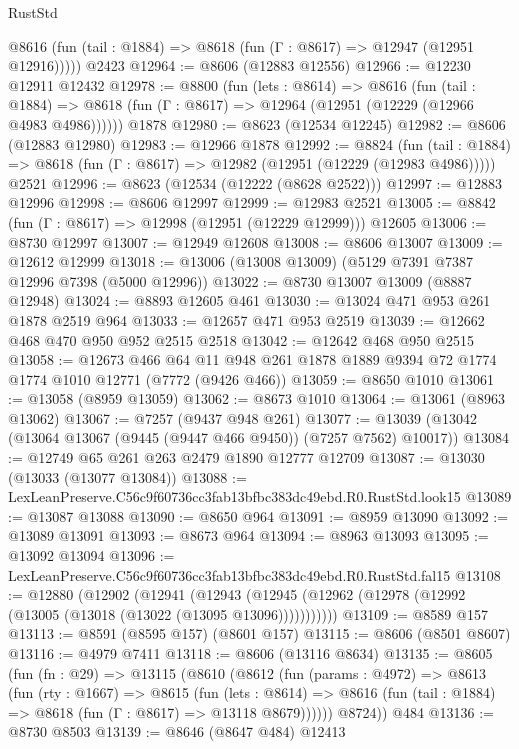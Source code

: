 \begin{lexlean}{RustStd}
\begin{coremodule}
      @8616 (fun (tail : @1884) => @8618 (fun (Γ : @8617) => @12947 (@12951 @12916)))))
    @2423
@12964 := @8606 (@12883 @12556)
@12966 := @12230 @12911 @12432
@12978 := @8800
    (fun (lets : @8614) =>
    @8616
      (fun (tail : @1884) =>
      @8618 (fun (Γ : @8617) => @12964 (@12951 (@12229 (@12966 @4983 @4986))))))
    @1878
@12980 := @8623 (@12534 @12245)
@12982 := @8606 (@12883 @12980)
@12983 := @12966 @1878
@12992 := @8824
    (fun (tail : @1884) => @8618 (fun (Γ : @8617) => @12982 (@12951 (@12229 (@12983 @4986)))))
    @2521
@12996 := @8623 (@12534 (@12222 (@8628 @2522)))
@12997 := @12883 @12996
@12998 := @8606 @12997
@12999 := @12983 @2521
@13005 := @8842 (fun (Γ : @8617) => @12998 (@12951 (@12229 @12999))) @12605
@13006 := @8730 @12997
@13007 := @12949 @12608
@13008 := @8606 @13007
@13009 := @12612 @12999
@13018 := @13006 (@13008 @13009) (@5129 @7391 @7387 @12996 @7398 (@5000 @12996))
@13022 := @8730 @13007 @13009 (@8887 @12948)
@13024 := @8893 @12605 @461
@13030 := @13024 @471 @953 @261 @1878 @2519 @964
@13033 := @12657 @471 @953 @2519
@13039 := @12662 @468 @470 @950 @952 @2515 @2518
@13042 := @12642 @468 @950 @2515
@13058 := @12673
    @466
    @64
    @11
    @948
    @261
    @1878
    @1889
    @9394
    @72
    @1774
    @1774
    @1010
    @12771
    (@7772 (@9426 @466))
@13059 := @8650 @1010
@13061 := @13058 (@8959 @13059)
@13062 := @8673 @1010
@13064 := @13061 (@8963 @13062)
@13067 := @7257 (@9437 @948 @261)
@13077 := @13039 (@13042 (@13064 @13067 (@9445 (@9447 @466 @9450)) (@7257 @7562) @10017))
@13084 := @12749 @65 @261 @263 @2479 @1890 @12777 @12709
@13087 := @13030 (@13033 (@13077 @13084))
@13088 := LexLeanPreserve.C56c9f60736cc3fab13bfbc383dc49ebd.R0.RustStd.look15
@13089 := @13087 @13088
@13090 := @8650 @964
@13091 := @8959 @13090
@13092 := @13089 @13091
@13093 := @8673 @964
@13094 := @8963 @13093
@13095 := @13092 @13094
@13096 := LexLeanPreserve.C56c9f60736cc3fab13bfbc383dc49ebd.R0.RustStd.fal15
@13108 := @12880
    (@12902
      (@12941
        (@12943 (@12945 (@12962 (@12978 (@12992 (@13005 (@13018 (@13022 (@13095 @13096)))))))))))
@13109 := @8589 @157
@13113 := @8591 (@8595 @157) (@8601 @157)
@13115 := @8606 (@8501 @8607)
@13116 := @4979 @7411
@13118 := @8606 (@13116 @8634)
@13135 := @8605
    (fun (fn : @29) =>
    @13115
      (@8610
        (@8612
          (fun (params : @4972) =>
          @8613
            (fun (rty : @1667) =>
            @8615
              (fun (lets : @8614) =>
              @8616 (fun (tail : @1884) => @8618 (fun (Γ : @8617) => @13118 @8679))))))
        @8724))
    @484
@13136 := @8730 @8503
@13139 := @8646 (@8647 @484) @12413

\end{coremodule}
\end{lexlean}
